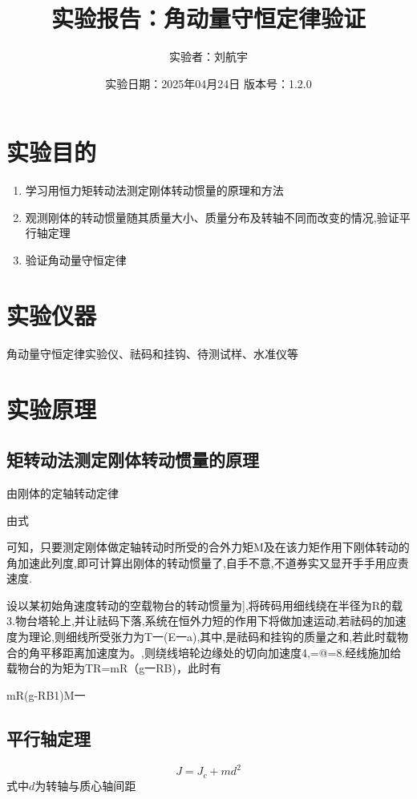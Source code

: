 \documentclass[12pt,a4paper]{article}
\title{实验报告：角动量守恒定律验证}
\author{实验者：刘航宇}
\date{实验日期：2025年04月24日 \quad 版本号：1.2.0}
\begin{document}
\maketitle

\section{实验目的}
\begin{enumerate}
\item 学习用恒力矩转动法测定刚体转动惯量的原理和方法
\item 观测刚体的转动惯量随其质量大小、质量分布及转轴不同而改变的情况,验证平行轴定理
\item 验证角动量守恒定律
\end{enumerate}

\section{实验仪器}

角动量守恒定律实验仪、祛码和挂钩、待测试样、水准仪等

\section{实验原理}

\subsection{矩转动法测定刚体转动惯量的原理}
由刚体的定轴转动定律

由式

\quad 可知，只要测定刚体做定轴转动时所受的合外力矩M及在该力矩作用下刚体转动的角加速此列度,即可计算出刚体的转动惯量了,自手不意,不道券实又显开手手用应责速度.

\quad 设以某初始角速度转动的空载物台的转动惯量为],将砖码用细线绕在半径为R的载3.物台塔轮上,并让祛码下落,系统在恒外力短的作用下将做加速运动,若祛码的加速度为理论,则细线所受张力为T一(E一a),其中,是祛码和挂钩的质量之和,若此时载物合的角平移距离加速度为。,则绕线培轮边缘处的切向加速度4,=@=8.经线施加给载物台的为矩为TR=mR（g一RB)，此时有

mR(g-RB1)M一

\subsection{平行轴定理}
\begin{equation}
J = J_c + md^2
\end{equation}
式中$d$为转轴与质心轴间距
\end{document}
